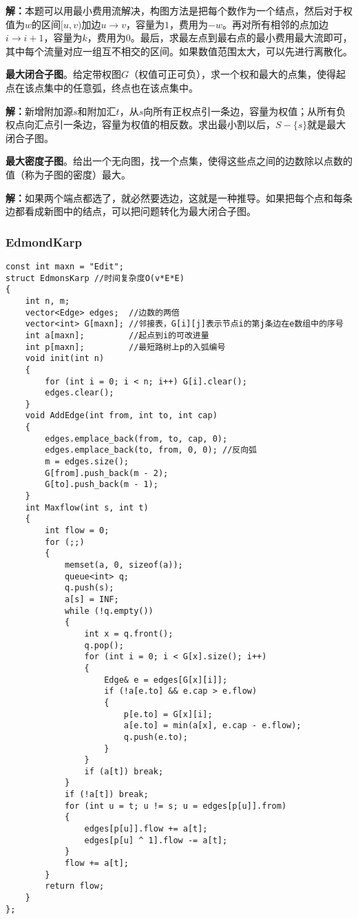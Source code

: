 \documentclass[twoside]{article}
\begin{document}
\indent

\textbf{解：}本题可以用最小费用流解决，构图方法是把每个数作为一个结点，然后对于权值为$w$的区间$[u,v)$加边$u→v$，容量为$1$，费用为$-w$。再对所有相邻的点加边$i→i+1$，容量为$k$，费用为$0$。最后，求最左点到最右点的最小费用最大流即可，其中每个流量对应一组互不相交的区间。如果数值范围太大，可以先进行离散化。

\indent

\textbf{最大闭合子图}。给定带权图$G$（权值可正可负），求一个权和最大的点集，使得起点在该点集中的任意弧，终点也在该点集中。

\indent

\textbf{解：}新增附加源$s$和附加汇$t$，从$s$向所有正权点引一条边，容量为权值；从所有负权点向汇点引一条边，容量为权值的相反数。求出最小割以后，$S - \lbrace s \rbrace$就是最大闭合子图。

\indent

\textbf{最大密度子图}。给出一个无向图，找一个点集，使得这些点之间的边数除以点数的值（称为子图的密度）最大。

\indent

\textbf{解：}如果两个端点都选了，就必然要选边，这就是一种推导。如果把每个点和每条边都看成新图中的结点，可以把问题转化为最大闭合子图。\subsubsection{EdmondKarp}
\begin{lstlisting}
const int maxn = "Edit";
struct EdmonsKarp //时间复杂度O(v*E*E)
{
    int n, m;
    vector<Edge> edges;  //边数的两倍
    vector<int> G[maxn]; //邻接表，G[i][j]表示节点i的第j条边在e数组中的序号
    int a[maxn];         //起点到i的可改进量
    int p[maxn];         //最短路树上p的入弧编号
    void init(int n)
    {
        for (int i = 0; i < n; i++) G[i].clear();
        edges.clear();
    }
    void AddEdge(int from, int to, int cap)
    {
        edges.emplace_back(from, to, cap, 0);
        edges.emplace_back(to, from, 0, 0); //反向弧
        m = edges.size();
        G[from].push_back(m - 2);
        G[to].push_back(m - 1);
    }
    int Maxflow(int s, int t)
    {
        int flow = 0;
        for (;;)
        {
            memset(a, 0, sizeof(a));
            queue<int> q;
            q.push(s);
            a[s] = INF;
            while (!q.empty())
            {
                int x = q.front();
                q.pop();
                for (int i = 0; i < G[x].size(); i++)
                {
                    Edge& e = edges[G[x][i]];
                    if (!a[e.to] && e.cap > e.flow)
                    {
                        p[e.to] = G[x][i];
                        a[e.to] = min(a[x], e.cap - e.flow);
                        q.push(e.to);
                    }
                }
                if (a[t]) break;
            }
            if (!a[t]) break;
            for (int u = t; u != s; u = edges[p[u]].from)
            {
                edges[p[u]].flow += a[t];
                edges[p[u] ^ 1].flow -= a[t];
            }
            flow += a[t];
        }
        return flow;
    }
};
\end{lstlisting}
\end{document}
